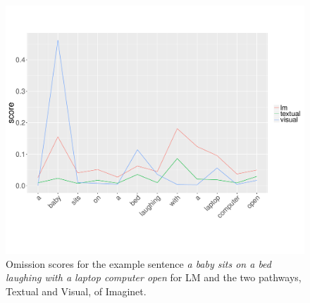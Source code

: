 
\begin{figure}[t]
  \centering
  \includegraphics[scale=0.3]{chapters/COLI/omissionex.pdf}
  \caption{Omission scores for the example sentence {\it a baby sits
      on a bed laughing with a laptop computer open} for {\sc LM} and
    the two pathways, {\sc Textual} and {\sc Visual}, of {\sc
      Imaginet.}}
  \label{fig:omissionex}
\end{figure}

